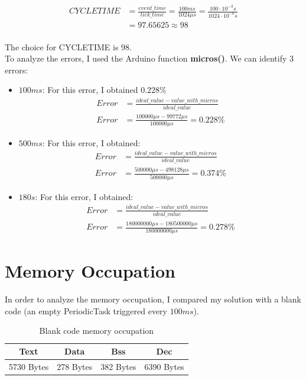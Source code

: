 \documentclass[a4paper]{article}
\begin{document}
\begin{align*}
  CYCLETIME & = \frac{event\_time}{tick\_time} = \frac{100ms}{1024\mu s} = \frac{100 \cdot 10^{-3} s}{1024 \cdot 10^{-6} s} \\[1ex]
            & = 97.65625 \approx 98
\end{align*} \\
The choice for CYCLETIME is 98. \\

To analyze the errors, I used the Arduino function \textbf{micros()}. We can identify 3 errors:
\begin{itemize}
  \item \(100ms\): For this error, I obtained \(0.228\%\)
        \begin{align*}
          Error & = \frac{ideal\_value - value\_with\_micros}{ideal\_value} \\[1ex]
          Error & = \frac{100000\mu s - 99772\mu s}{100000\mu s} = 0.228\%
        \end{align*}
  \item \(500ms\): For this error, I obtained:
        \begin{align*}
          Error & = \frac{ideal\_value - value\_with\_micros}{ideal\_value} \\[1ex]
          Error & = \frac{500000\mu s - 498128\mu s}{500000\mu s} = 0.374\%
        \end{align*}
  \item \(180s\): For this error, I obtained:
        \begin{align*}
          Error & = \frac{ideal\_value - value\_with\_micros}{ideal\_value}          \\[1ex]
          Error & = \frac{180000000\mu s - 180500000\mu s}{180000000\mu s} = 0.278\%
        \end{align*}
\end{itemize}


\section{Memory Occupation}

In order to analyze the memory occupation, I compared my solution with a blank code (an empty PeriodicTask triggered every \(100ms\)).

\begin{table}[h]
  \centering
  \begin{tabular}{|| c || c || c || c ||}
    \hline
    \textbf{Text} & \textbf{Data} & \textbf{Bss} & \textbf{Dec} \\
    \hline
    5730 Bytes    & 278 Bytes     & 382 Bytes    & 6390 Bytes   \\
    \hline
  \end{tabular}
  \caption{Blank code memory occupation}
  \label{Table1}
\end{table}
\end{document}
